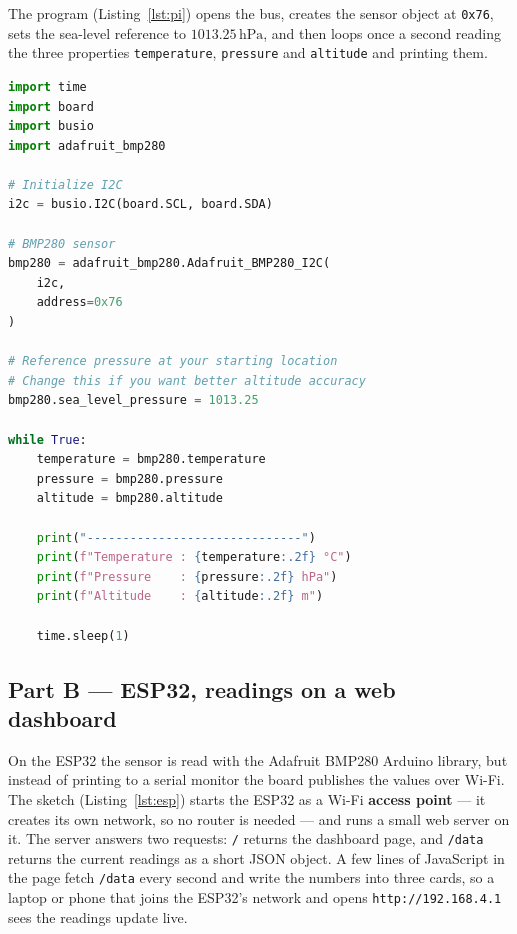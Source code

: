 \documentclass[10pt,a4paper]{article}
\begin{document}
\noindent The program (Listing~\ref{lst:pi}) opens the bus, creates the sensor object
at \texttt{0x76}, sets the sea-level reference to $1013.25\,\mathrm{hPa}$, and then loops
once a second reading the three properties \texttt{temperature}, \texttt{pressure} and
\texttt{altitude} and printing them.

\begin{lstlisting}[language=Python, caption={Part A --- \texttt{pressure.py} on the Raspberry Pi: temperature, pressure and altitude every second.}, label={lst:pi}]
import time
import board
import busio
import adafruit_bmp280

# Initialize I2C
i2c = busio.I2C(board.SCL, board.SDA)

# BMP280 sensor
bmp280 = adafruit_bmp280.Adafruit_BMP280_I2C(
    i2c,
    address=0x76
)

# Reference pressure at your starting location
# Change this if you want better altitude accuracy
bmp280.sea_level_pressure = 1013.25

while True:
    temperature = bmp280.temperature
    pressure = bmp280.pressure
    altitude = bmp280.altitude

    print("------------------------------")
    print(f"Temperature : {temperature:.2f} °C")
    print(f"Pressure    : {pressure:.2f} hPa")
    print(f"Altitude    : {altitude:.2f} m")

    time.sleep(1)
\end{lstlisting}


\subsection{Part B --- ESP32, readings on a web dashboard}

On the ESP32 the sensor is read with the Adafruit BMP280 Arduino library, but instead
of printing to a serial monitor the board publishes the values over Wi-Fi. The sketch
(Listing~\ref{lst:esp}) starts the ESP32 as a Wi-Fi \textbf{access point} --- it creates
its own network, so no router is needed --- and runs a small web server on it. The
server answers two requests: \texttt{/} returns the dashboard page, and \texttt{/data}
returns the current readings as a short JSON object. A few lines of JavaScript in the
page fetch \texttt{/data} every second and write the numbers into three cards, so a
laptop or phone that joins the ESP32's network and opens \texttt{http://192.168.4.1}
sees the readings update live.
\end{document}
